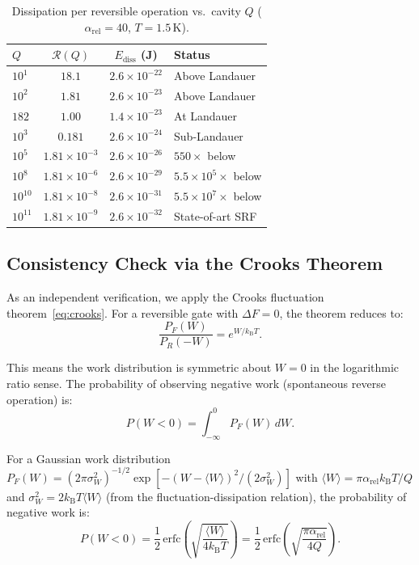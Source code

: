 \documentclass[11pt,twocolumn]{article}
\theoremstyle{definition}
\theoremstyle{remark}
\newcommand{\kB}{k_{\mathrm{B}}}
\begin{document}
\begin{table}[h]
\centering
\caption{Dissipation per reversible operation vs.\ cavity $Q$
($\alpha_{\mathrm{rel}} = 40$, $T = 1.5\,\mathrm{K}$).}
\label{tab:dissipation_vs_Q}
\begin{tabular}{@{}lccl@{}}
\toprule
$Q$ & $\mathcal{R}(Q)$ & $E_{\mathrm{diss}}$ (J) & Status \\
\midrule
$10^1$ & $18.1$ & $2.6\times 10^{-22}$ & Above Landauer \\
$10^2$ & $1.81$ & $2.6\times 10^{-23}$ & Above Landauer \\
$182$ & $1.00$ & $1.4\times 10^{-23}$ & At Landauer \\
$10^3$ & $0.181$ & $2.6\times 10^{-24}$ & Sub-Landauer \\
$10^5$ & $1.81\times 10^{-3}$ & $2.6\times 10^{-26}$ & $550\times$ below \\
$10^8$ & $1.81\times 10^{-6}$ & $2.6\times 10^{-29}$ & $5.5\times 10^5\times$ below \\
$10^{10}$ & $1.81\times 10^{-8}$ & $2.6\times 10^{-31}$ & $5.5\times 10^7\times$ below \\
$10^{11}$ & $1.81\times 10^{-9}$ & $2.6\times 10^{-32}$ & State-of-art SRF \\
\bottomrule
\end{tabular}
\end{table}

\subsection{Consistency Check via the Crooks Theorem}\label{sec:crooks_check}

As an independent verification, we apply the Crooks fluctuation
theorem~\eqref{eq:crooks}. For a reversible gate with $\Delta F = 0$,
the theorem reduces to:
\begin{equation}
\frac{P_F(W)}{P_R(-W)} = e^{W/\kB T}.
\label{eq:crooks_rev}
\end{equation}

This means the work distribution is symmetric about $W = 0$ in the
logarithmic ratio sense. The probability of observing negative work
(spontaneous reverse operation) is:
\begin{equation}
P(W < 0) = \int_{-\infty}^0 P_F(W)\,dW.
\end{equation}

For a Gaussian work distribution $P_F(W) = (2\pi\sigma_W^2)^{-1/2}
\exp[-(W - \langle W\rangle)^2/(2\sigma_W^2)]$ with $\langle W\rangle
= \pi\alpha_{\mathrm{rel}}\kB T/Q$ and $\sigma_W^2 = 2\kB T\langle
W\rangle$ (from the fluctuation-dissipation relation), the probability
of negative work is:
\begin{equation}
P(W < 0) = \frac{1}{2}\,\mathrm{erfc}\!\left(\sqrt{\frac{\langle W\rangle}{4\kB T}}\right)
= \frac{1}{2}\,\mathrm{erfc}\!\left(\sqrt{\frac{\pi\alpha_{\mathrm{rel}}}{4Q}}\right).
\end{equation}
\end{document}
